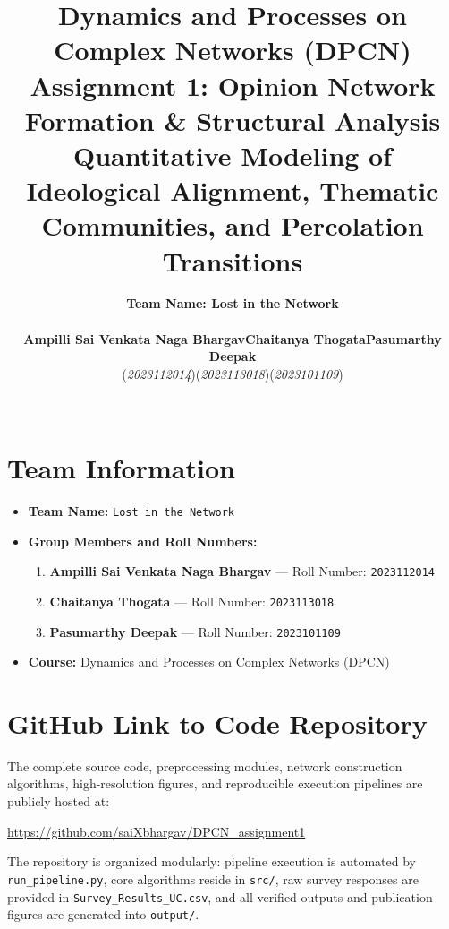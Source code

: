 \documentclass[10pt,twocolumn,a4paper]{article}
\title{\vspace{-1.2em}\textbf{\Large Dynamics and Processes on Complex Networks (DPCN)}\\\vspace{0.25em}
\textbf{\large Assignment 1: Opinion Network Formation \& Structural Analysis}\\\vspace{0.25em}
\normalsize Quantitative Modeling of Ideological Alignment, Thematic Communities, and Percolation Transitions}
\author{
    \textbf{Team Name: Lost in the Network} \\[0.3em]
    \normalsize
    \begin{tabular}{ccc}
        \textbf{Ampilli Sai Venkata Naga Bhargav} & \textbf{Chaitanya Thogata} & \textbf{Pasumarthy Deepak} \\
        (\textit{2023112014}) & (\textit{2023113018}) & (\textit{2023101109})
    \end{tabular}\\[0.25em]
}
\begin{document}
\maketitle

\section{Team Information}
\label{sec:team}

\begin{itemize}[noitemsep,topsep=1pt,leftmargin=1.2em]
    \item \textbf{Team Name:} \texttt{Lost in the Network}
    \item \textbf{Group Members and Roll Numbers:}
    \begin{enumerate}[noitemsep,topsep=1pt,leftmargin=1.2em]
        \item \textbf{Ampilli Sai Venkata Naga Bhargav} --- Roll Number: \texttt{2023112014}
        \item \textbf{Chaitanya Thogata} --- Roll Number: \texttt{2023113018}
        \item \textbf{Pasumarthy Deepak} --- Roll Number: \texttt{2023101109}
    \end{enumerate}
    \item \textbf{Course:} Dynamics and Processes on Complex Networks (DPCN)
\end{itemize}

\section{GitHub Link to Code Repository}
\label{sec:github}

The complete source code, preprocessing modules, network construction algorithms, high-resolution figures, and reproducible execution pipelines are publicly hosted at:
\begin{center}
    \url{https://github.com/saiXbhargav/DPCN_assignment1}
\end{center}
The repository is organized modularly: pipeline execution is automated by \texttt{run\_pipeline.py}, core algorithms reside in \texttt{src/}, raw survey responses are provided in \texttt{Survey\_Results\_UC.csv}, and all verified outputs and publication figures are generated into \texttt{output/}.
\end{document}
